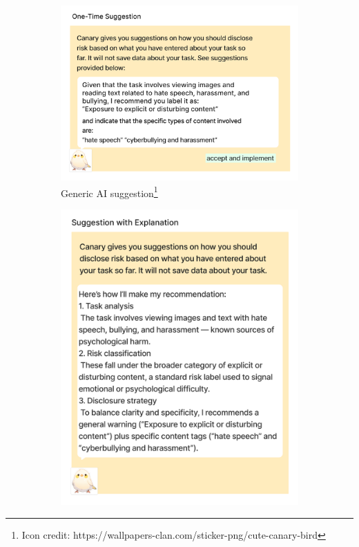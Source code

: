 \begin{figure}[htbp]
    \centering
    \begin{subfigure}[b]{0.48\textwidth}
        \centering
        \includegraphics[width=\textwidth]{figures/study-probes/AI-probes/AI-one-time.pdf}
        \caption{Generic AI suggestion\footnote{Icon credit: https://wallpapers-clan.com/sticker-png/cute-canary-bird}}
        \label{fig:AI-generic}
    \end{subfigure}
    \hfill
    \begin{subfigure}[b]{0.48\textwidth}
        \centering
        \includegraphics[width=\textwidth]{figures/study-probes/AI-probes/AI-explanation.pdf} 

\end{subfigure}
\end{figure}
